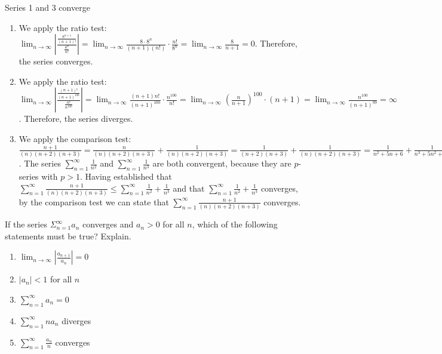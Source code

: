 \begin{Answer}[ref = ratio1]
Series 1 and 3 converge
\begin{enumerate}
\item We apply the ratio test: $\lim_{n \to \infty} \left| \frac{\frac{8^
{n + 1}}{(n + 1)!}}{\frac{8^n}{n!}} \right| = \lim_{n \to \infty} \frac{8 
\cdot 8^n}{(n + 1)(n!)} \cdot \frac{n!}{8^n} = \lim_{n \to \infty} 
\frac{8}{n + 1} = 0$. Therefore, the series converges. 
\item We apply the ratio test: $\lim_{n \to \infty} \left| \frac{\frac{(n + 1)!}
{(n + 1)^{100}}}{\frac{n!}{n^{100}}} \right| = \lim_{n \to \infty} \frac{(n + 1)
n!}{(n + 1)^{100}} \cdot \frac{n^{100}}{n!} = \lim_{n \to \infty} \left( 
\frac{n}{n + 1} \right)^{100} \cdot (n + 1) = \lim_{n \to \infty} \frac{n^{100}
}{(n + 1)^{99}} = \infty$. Therefore, the series diverges. 
\item We apply the comparison test: $\frac{n + 1}{(n)(n + 2)(n + 3)} = \frac{n}
{(n)(n + 2)(n + 3)} + \frac{1}{(n)(n + 2)(n + 3)} = \frac{1}{(n + 2)(n + 3)} + 
\frac{1}{(n)(n + 2)(n + 3)} = \frac{1}{n^2 + 5n + 6} + \frac{1}{n^3 + 5n^2 + 
6n} \leq \frac{1}{n^2} + \frac{1}{n^3}$. The series $\sum_{n = 1}^\infty 
\frac{1}{n^2}$ and $\sum_{n = 1}^\infty \frac{1}{n^3}$ are both convergent, 
because they are $p$-series with $p > 1$. Having established that $\sum_{n=1}
^\infty \frac{n + 1}{(n)(n + 2)(n + 3)} \leq \sum_{n=1}^\infty \frac{1}{n^2} 
+ \frac{1}{n^3}$ and that $\sum_{n=1}^\infty \frac{1}{n^2} + \frac{1}{n^3}$ 
converges, by the comparison test we can state that $\sum_{n=1}^\infty 
\frac{n + 1}{(n)(n+2)(n+3)}$ converges. 
\end{enumerate}
\end{Answer}

\begin{Exercise}If the series $\Sigma_{n = 1}^\infty 
a_n$ converges and $a_n > 0$ for all $n$, which of the following statements 
must be true? Explain. 
\begin{enumerate}
\item $\lim_{n \to \infty} \left| \frac{a_{n + 1}}{a_n} \right| = 0$
\item $|a_n|<1$ for all $n$
\item $\sum_{n=1}^\infty a_n = 0$
\item $\sum_{n=1}^\infty na_n$ diverges
\item $\sum_{n=1}^\infty \frac{a_n}{n}$ converges
\end{enumerate}
\end{Exercise}

